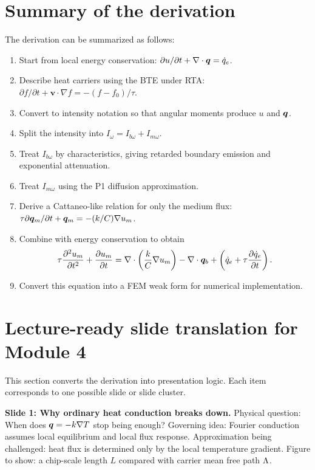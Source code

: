 \documentclass[11pt]{article}
\begin{document}
\section{Summary of the derivation}
The derivation can be summarized as follows:
\begin{enumerate}[leftmargin=1.6em]
    \item Start from local energy conservation: \(\partial u/\partial t+\nabla\cdot\bm{q}=\dot{q}_e\).
    \item Describe heat carriers using the BTE under RTA: \(\partial f/\partial t+\bm{v}\cdot\nabla f=-(f-f_0)/\tau\).
    \item Convert to intensity notation so that angular moments produce \(u\) and \(\bm{q}\).
    \item Split the intensity into \(I_\omega=I_{b\omega}+I_{m\omega}\).
    \item Treat \(I_{b\omega}\) by characteristics, giving retarded boundary emission and exponential attenuation.
    \item Treat \(I_{m\omega}\) using the P1 diffusion approximation.
    \item Derive a Cattaneo-like relation for only the medium flux: \(\tau\partial\bm{q}_m/\partial t+\bm{q}_m=-(k/C)\nabla u_m\).
    \item Combine with energy conservation to obtain
    \begin{equation*}
    \tau\frac{\partial^2u_m}{\partial t^2}+\frac{\partial u_m}{\partial t}
    =\nabla\cdot\left(\frac{k}{C}\nabla u_m\right)-\nabla\cdot\bm{q}_b
    +\left(\dot{q}_e+\tau\frac{\partial\dot{q}_e}{\partial t}\right).
    \end{equation*}
    \item Convert this equation into a FEM weak form for numerical implementation.
\end{enumerate}


\section{Lecture-ready slide translation for Module 4}
This section converts the derivation into presentation logic. Each item corresponds to one possible slide or slide cluster.

\begin{notebox}
\textbf{Slide 1: Why ordinary heat conduction breaks down.}
Physical question: When does \(\bm{q}=-k\nabla T\) stop being enough? Governing idea: Fourier conduction assumes local equilibrium and local flux response. Approximation being challenged: heat flux is determined only by the local temperature gradient. Figure to show: a chip-scale length \(L\) compared with carrier mean free path \(\Lambda\).
\end{notebox}
\end{document}
